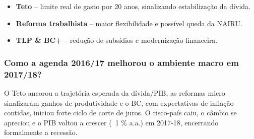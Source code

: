\documentclass[a4paper,12pt]{article}[abntex2]
\begin{document}
\begin{itemize}
  \item \textbf{Teto} – limite real de gasto por 20 anos, sinalizando estabilização da dívida. 
  \item \textbf{Reforma trabalhista} – maior flexibilidade e possível queda da NAIRU. 
  \item \textbf{TLP \& BC+} – redução de subsídios e modernização financeira. 
\end{itemize}

\subsubsection{\textbf{Como a agenda 2016/17 melhorou o ambiente macro em 2017/18?}}

O Teto ancorou a trajetória esperada da dívida/PIB, as reformas micro sinalizaram ganhos de produtividade e o BC, com expectativas de inflação contidas, iniciou forte ciclo de corte de juros. O risco-país caiu, o câmbio se apreciou e o PIB voltou a crescer (~1 \% a.a.) em 2017-18, encerrando formalmente a recessão. 
\end{document}
